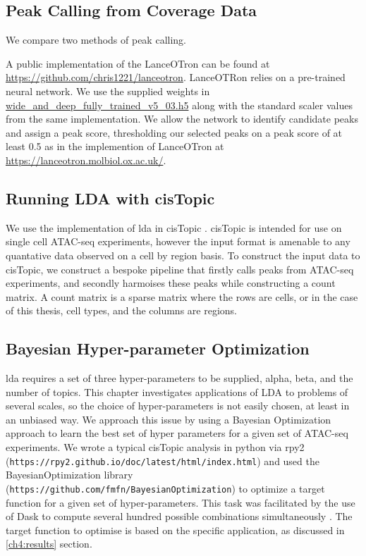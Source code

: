 \subsection{Peak Calling from Coverage Data} \label{ch4:method_peaks}

We compare two methods of peak calling.

A public implementation of the LanceOTron can be found at \url{https://github.com/chris1221/lanceotron}. LanceOTRon relies on a pre-trained neural network. We use the supplied weights in \url{wide_and_deep_fully_trained_v5_03.h5} along with the standard scaler values from the same implementation. We allow the network to identify candidate peaks and assign a peak score, thresholding our selected peaks on a peak score of at least 0.5 as in the implemention of LanceOTron at \url{https://lanceotron.molbiol.ox.ac.uk/}.


\subsection{Running LDA with cisTopic} \label{ch4:method_cistopic}

We use the implementation of \gls{lda} in cisTopic \cite{BravoGonzalez-Blas2019}. cisTopic is intended for use on single cell ATAC-seq experiments, however the input format is amenable to any quantative data observed on a cell by region basis. To construct the input data to cisTopic, we construct a bespoke pipeline that firstly calls peaks from ATAC-seq experiments, and secondly harmoises these peaks while constructing a count matrix. A count matrix is a sparse matrix where the rows are cells, or in the case of this thesis, cell types, and the columns are regions.



\subsection{Bayesian Hyper-parameter Optimization} \label{ch4:hyper}

\gls{lda} requires a set of three hyper-parameters to be supplied, alpha, beta, and the number of topics. This chapter investigates applications of LDA to problems of several scales, so the choice of hyper-parameters is not easily chosen, at least in an unbiased way. We approach this issue by using a Bayesian Optimization approach to learn the best set of hyper parameters for a given set of ATAC-seq experiments. We wrote a typical cisTopic analysis in python via rpy2 ({\tt https://rpy2.github.io/doc/latest/html/index.html}) and used the BayesianOptimization library ({\tt https://github.com/fmfn/BayesianOptimization}) to optimize a target function for a given set of hyper-parameters. This task was facilitated by the use of Dask to compute several hundred possible combinations simultaneously \cite{Rocklin2015}. The target function to optimise is based on the specific application, as discussed in \autoref{ch4:results} section.

